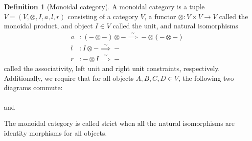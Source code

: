 \documentclass[reqno]{amsart}
\theoremstyle{definition}
\newtheorem{definition}[theorem]{Definition}
\theoremstyle{remark}
\begin{document}
   \begin{definition}[Monoidal category]
       A monoidal category is a tuple
       $V = \left( V, \otimes, I, a, l ,r \right) $ consisting
       of a category $V$, a functor
       $\otimes \colon V \times V \to V$ called the
       monoidal product, and object $I \in V$ called the
       unit, and natural isomorphisms
       \begin{align*}
           a &\colon \left( - \otimes - \right) \otimes -
           \stackrel{\sim}{\implies} - \otimes \left( - 
           \otimes - \right)\\
           l &\colon I \otimes - \stackrel{\sim}{\implies} -\\
           r &\colon - \otimes I \stackrel{\sim}{\implies} -
       \end{align*}
       called the associativity, left unit and right unit
       constraints, respectively. 
       Additionally, we require that for all
       objects $A,B,C,D \in V$, the following two diagrams
       commute:\\[2 ex]

   \\[1 ex]
   and
   \\[1 ex]


The monoidal category is called strict when all the
natural isomorphisms are identity morphisms for all objects.
   \end{definition}
\end{document}
